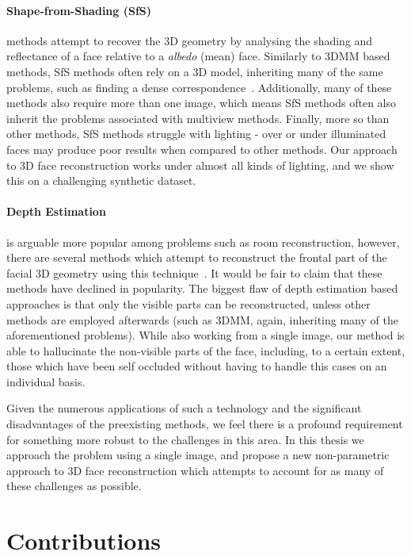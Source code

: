 \paragraph{Shape-from-Shading (SfS)} methods attempt to recover the 3D
geometry by analysing the shading and reflectance of a face relative
to a \textit{albedo} (mean) face. Similarly to 3DMM based methods, SfS
methods often rely on a 3D model, inheriting many of the same
problems, such as finding a dense
correspondence~\cite{suwajanakorn2014total,jiang20183d}. Additionally,
many of these methods also require more than one image, which means
SfS methods often also inherit the problems associated with multiview
methods. Finally, more so than other methods, SfS methods struggle
with lighting - over or under illuminated faces may produce poor
results when compared to other methods. Our approach to 3D face
reconstruction works under almost all kinds of lighting, and we show
this on a challenging synthetic dataset.

\paragraph{Depth Estimation} is arguable more popular among problems
such as room reconstruction, however, there are several methods which
attempt to reconstruct the frontal part of the facial 3D geometry
using this technique~\cite{sun2011depth,sun2013depth}. It would be
fair to claim that these methods have declined in popularity. The
biggest flaw of depth estimation based approaches is that only the
visible parts can be reconstructed, unless other methods are employed
afterwards (such as 3DMM, again, inheriting many of the aforementioned
problems). While also working from a single image, our method is able
to hallucinate the non-visible parts of the face, including, to a
certain extent, those which have been self occluded without having to
handle this cases on an individual basis.

Given the numerous applications of such a technology and the
significant disadvantages of the preexisting methods, we feel there is
a profound requirement for something more robust to the challenges in
this area. In this thesis we approach the problem using a single
image, and propose a new non-parametric approach to 3D face
reconstruction which attempts to account for as many of these
challenges as possible.

\section{Contributions}

